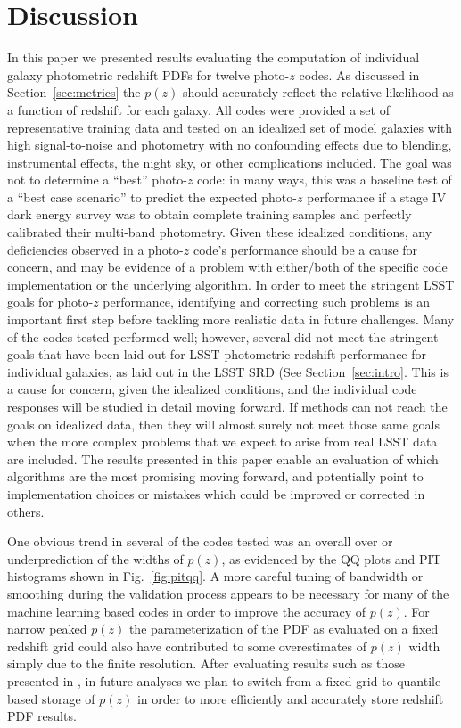 \section{Discussion}
\label{sec:discussion}
In this paper we presented results evaluating the computation of individual galaxy photometric redshift PDFs for twelve photo-$z$ codes.  As discussed in Section~\ref{sec:metrics} the $p(z)$ should accurately reflect the relative likelihood as a function of redshift for each galaxy.  All codes were provided a set of representative training data and tested on an idealized set of model galaxies with high signal-to-noise and photometry with no confounding effects due to blending, instrumental effects, the night sky, or other complications included.  The goal was not to determine a ``best'' photo-$z$ code: in many ways, this was a baseline test of a ``best case scenario'' to predict the expected photo-$z$ performance if a stage IV dark energy survey was to obtain complete training samples and perfectly calibrated their multi-band photometry.  Given these idealized conditions, any deficiencies observed in a photo-$z$ code's performance should be a cause for concern, and may be evidence of a problem with either/both of the specific code implementation or the underlying algorithm.  In order to meet the stringent LSST goals for photo-$z$ performance, identifying and correcting such problems is an important first step before tackling more realistic data in future challenges.  Many of the codes tested performed well; however, several did not meet the stringent goals that have been laid out for LSST photometric redshift performance for individual galaxies, as laid out in the LSST SRD (See Section~\ref{sec:intro}.  This is a cause for concern, given the idealized conditions, and the individual code responses will be studied in detail moving forward.  If methods can not reach the goals on idealized data, then they will almost surely not meet those same goals when the more complex problems that we expect to arise from real LSST data are included.  The results presented in this paper enable an evaluation of which algorithms are the most promising moving forward, and potentially point to implementation choices or mistakes which could be improved or corrected in others. 

One obvious trend in several of the codes tested was an overall over or underprediction of the widths of $p(z)$, as evidenced by the QQ plots and PIT histograms shown in Fig.~\ref{fig:pitqq}.  A more careful tuning of bandwidth or smoothing during the validation process appears to be necessary for many of the machine learning based codes in order to improve the accuracy of $p(z)$.  For narrow peaked $p(z)$ the parameterization of the PDF as evaluated on a fixed redshift grid could also have contributed to some overestimates of $p(z)$ width simply due to the finite resolution.  After evaluating results such as those presented in \citet[]{Malz:qp}, in future analyses we plan to switch from a fixed grid to quantile-based storage of $p(z)$ in order to more efficiently and accurately store redshift PDF results.

